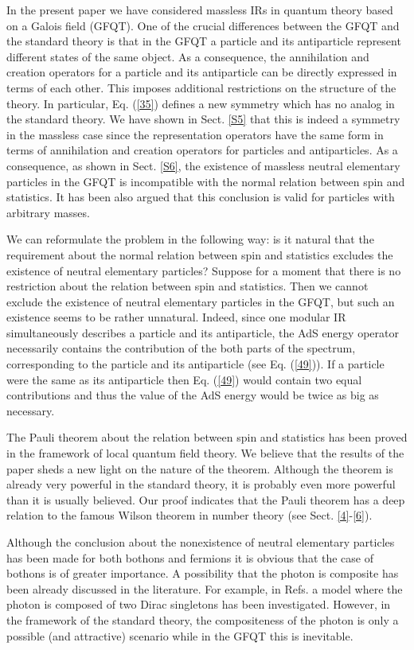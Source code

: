 \documentclass[a4paper,12pt]{article}%
\begin{document}
In the present paper we have considered massless IRs in
quantum theory based on a Galois field (GFQT). One of
the crucial differences between the GFQT and the 
standard theory is that in the GFQT a particle and its 
antiparticle represent different states of the same 
object. As a consequence, the annihilation and creation
operators for a particle and its antiparticle can be 
directly expressed in terms of each other. This imposes 
additional restrictions on the structure of the theory. 
In particular, Eq. (\ref{35}) defines a new symmetry which
has no analog in the standard theory. We have shown in
Sect. \ref{S5} that this is indeed a symmetry in the
massless case since the representation operators have 
the same form in terms of annihilation and creation 
operators for particles and antiparticles. As a consequence,
as shown in Sect. \ref{S6}, the existence of massless 
neutral elementary particles in the GFQT is incompatible
with the normal relation between spin and statistics. It
has been also argued that this conclusion is valid for
particles with arbitrary masses.   

We can reformulate the problem in the following way: is it natural 
that the requirement about the normal relation between spin and
statistics excludes the existence of neutral elementary
particles? Suppose for a moment that there is no restriction
about the relation between spin and statistics. Then we cannot
exclude the existence of neutral elementary particles in the
GFQT, but such an existence seems to be rather unnatural.
Indeed, since one modular IR simultaneously describes a 
particle and its antiparticle, the AdS energy operator 
necessarily contains the contribution of
the both parts of the spectrum, corresponding to the particle
and its antiparticle (see Eq. (\ref{49})). If a particle
were the same as its antiparticle then Eq. (\ref{49}) would 
contain two equal contributions and thus the value of the AdS
energy would be twice as big as necessary. 

The Pauli theorem about the relation between spin and
statistics \cite{Pauli} has been proved in the framework
of local quantum field theory. We believe that the results
of the paper sheds a new light on the nature of the  
theorem. Although the theorem is already very powerful in
the standard theory, it is probably even more powerful 
than it is usually believed. Our proof indicates that
the Pauli theorem has a deep relation to the famous
Wilson theorem in number theory (see Sect. \ref{4}-\ref{6}). 

Although the conclusion about the nonexistence
of neutral elementary particles has been
made for both bothons and fermions it is obvious that
the case of bothons is of greater importance. 
A possibility that the photon is composite has been 
already discussed in the literature. For 
example, in Refs. \cite{FF,Castell,FronsdalS} a model 
where the photon is composed of two Dirac singletons 
\cite{DiracS} has been investigated. However, in the 
framework of the standard theory, the compositeness of 
the photon is only a possible (and attractive) scenario 
while in the GFQT this is inevitable.
\end{document}
